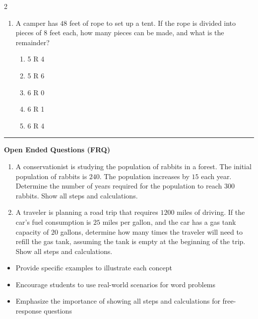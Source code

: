 \documentclass[10pt]{article}
\begin{document}
\begin{multicols}{2}
\begin{enumerate}[label=\textbf{Q\arabic*.}, leftmargin=*, itemsep=6pt, parsep=0pt]
  \item \small A camper has $48$ feet of rope to set up a tent. If the rope is divided into pieces of $8$ feet each, how many pieces can be made, and what is the remainder?
  \begin{enumerate}[label=(\Alph*), leftmargin=0.6cm, nosep, itemsep=2pt]
    \item 5 R 4
    \item 5 R 6
    \item 6 R 0
    \item 6 R 1
    \item 6 R 4
  \end{enumerate}

\end{enumerate}
\end{multicols}

\vspace{-0.2cm}
\hrule
\vspace{0.2cm}
\textbf{\small Open Ended Questions (FRQ)}
\begin{enumerate}[label=\textbf{Q\arabic*.}, start=9, itemsep=5pt, topsep=0pt]

  \item \small A conservationist is studying the population of rabbits in a forest. The initial population of rabbits is $240$. The population increases by $15$ each year. Determine the number of years required for the population to reach $300$ rabbits. Show all steps and calculations. \vspace{2cm}

  \item \small A traveler is planning a road trip that requires $1200$ miles of driving. If the car's fuel consumption is $25$ miles per gallon, and the car has a gas tank capacity of $20$ gallons, determine how many times the traveler will need to refill the gas tank, assuming the tank is empty at the beginning of the trip. Show all steps and calculations. \vspace{2cm}

\end{enumerate}

\vfill

\begin{tcolorbox}[colback=blue!5, colframe=mainblue!50, title=\small \textbf{Chef's Tips}, fonttitle=\bfseries, bottom=1mm]
\begin{itemize}[noitemsep, topsep=2pt, leftmargin=0.5cm]
  \item \scriptsize Provide specific examples to illustrate each concept\item \scriptsize Encourage students to use real-world scenarios for word problems\item \scriptsize Emphasize the importance of showing all steps and calculations for free-response questions
\end{itemize}
\end{tcolorbox}
\end{document}
